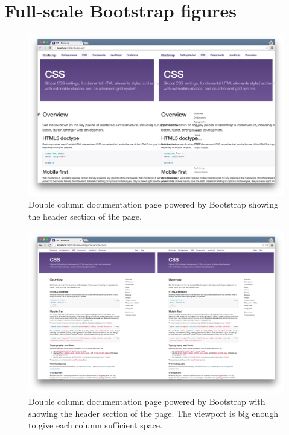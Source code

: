 \documentclass[a4paper,11pt]{kth-mag}
\begin{document}
      \section{Full-scale Bootstrap figures}
        \begin{figure}[htbp!]
          \centering
          \includegraphics[width=0.9\linewidth]{images/bootstrap-mq-header-small}
          \caption{Double column documentation page powered by \gls{Bootstrap} showing the header section of the page.}
          \label{fig:appendix-bootstrap-mq-header-small}
        \end{figure}
        \begin{figure}[htbp!]
          \centering
          \includegraphics[width=0.9\linewidth]{images/bootstrap-mq-header-big}
          \caption{Double column documentation page powered by \gls{Bootstrap} with showing the header section of the page. The \gls{viewport} is big enough to give each column sufficient space.}
          \label{fig:appendix-bootstrap-mq-header-big}
        \end{figure}
\end{document}
